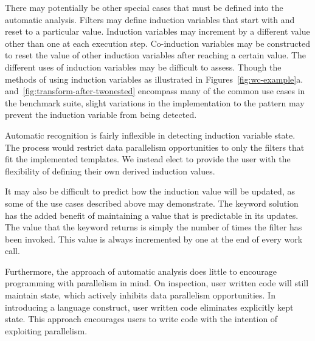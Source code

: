 There may potentially be other special cases that must be defined into the automatic analysis.  Filters may define induction variables that start with and reset to a particular value.  Induction variables may increment by a different value other than one at each execution step.  Co-induction variables may be constructed to reset the value of other induction variables after reaching a certain value.  The different uses of induction variables may be difficult to assess.  Though the methods of using induction variables as illustrated in Figures~\ref{fig:wc-example}a. and~\ref{fig:transform-after-twonested} encompass many of the common use cases in the benchmark suite, slight variations in the implementation to the pattern may prevent the induction variable from being detected.

Automatic recognition is fairly inflexible in detecting induction variable state.  The process would restrict data parallelism opportunities to only the filters that fit the implemented templates.  We instead elect to provide the user with the flexibility of defining their own derived induction values.  

It may also be difficult to predict how the induction value will be updated, as some of the use cases described above may demonstrate.  The keyword solution has the added benefit of maintaining a value that is predictable in its updates.  The value that the keyword returns is simply the number of times the filter has been invoked.  This value is always incremented by one at the end of every work call.  

Furthermore, the approach of automatic analysis does little to encourage programming with parallelism in mind.  On inspection, user written code will still maintain state, which actively inhibits data parallelism opportunities.  In introducing a language construct, user written code eliminates explicitly kept state.  This approach encourages users to write code with the intention of exploiting parallelism.


